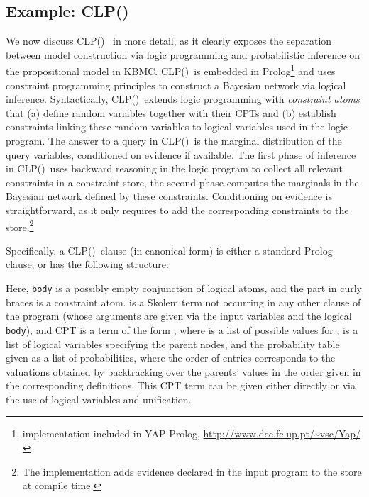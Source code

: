 \documentclass[a4paper]{article}
\newcommand{\clpbn}
  {CLP()}
\begin{document}
\subsection{Example: \clpbn}
\label{sec:cplbbn}
We now discuss \clpbn~\citep{clpbn} in more detail, as it
clearly exposes the separation between model
construction via logic programming and probabilistic inference on the
propositional model in KBMC. \clpbn\ is embedded in
Prolog\footnote{implementation included in YAP Prolog,
  \url{http://www.dcc.fc.up.pt/~vsc/Yap/}} and uses constraint
programming principles to construct a Bayesian network via
logical inference. Syntactically, \clpbn\ extends logic programming
with \emph{constraint atoms} that (a) define random variables together
with their CPTs and (b) establish constraints linking these random
variables to logical variables used in the logic program. The answer
to a query in \clpbn\ is the marginal distribution of the query
variables, conditioned on evidence if available. 
The first
phase of inference in
\clpbn\ uses backward reasoning in the logic program to collect
all relevant constraints in a constraint store, the second phase computes the marginals in the
Bayesian network defined by these constraints. Conditioning on
evidence is straightforward, as it only requires to add the
corresponding constraints to the store.\footnote{The implementation
  adds evidence declared in the input program to the store at compile time.}

Specifically, a \clpbn\ clause (in canonical form) is either a
standard Prolog clause, or has the following
structure:

Here, \verb|body| is a possibly empty conjunction of logical atoms,
and the part in curly braces is a constraint atom. 
 is a Skolem term  not occurring in any other clause of
the program (whose arguments  are given via the input
variables  and the logical \verb|body|), and CPT is a
term of the form , where  is a list of possible
values for ,  is a
list of logical variables specifying the parent nodes, and  the probability table given as  a list of probabilities, where the order
of entries corresponds to the valuations obtained by backtracking over
the parents' values in the order given in the corresponding
definitions. This CPT term can be given either directly or via the use of
logical variables and unification. 
\end{document}
